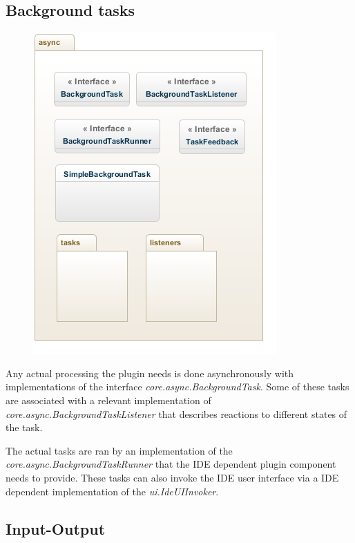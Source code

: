 \documentclass[12pt,a4paper,english,leqno]{article}
\begin{document}
\subsection{Background tasks}

\begin{figure}[ht!]
\centering
\includegraphics[scale=1]{img/async.jpg}
\end{figure}

Any actual processing the plugin needs is done asynchronously with implementations of the interface \textit{core.async.BackgroundTask}.
Some of these tasks are associated with a relevant implementation of \textit{core.async.BackgroundTaskListener} that describes reactions to different states of the task.

The actual tasks are ran by an implementation of the \textit{core.async.BackgroundTaskRunner} that the IDE dependent plugin component needs to provide.
These tasks can also invoke the IDE user interface via a IDE dependent implementation of the \textit{ui.IdeUIInvoker}.

\subsection{Input-Output}
\end{document}
